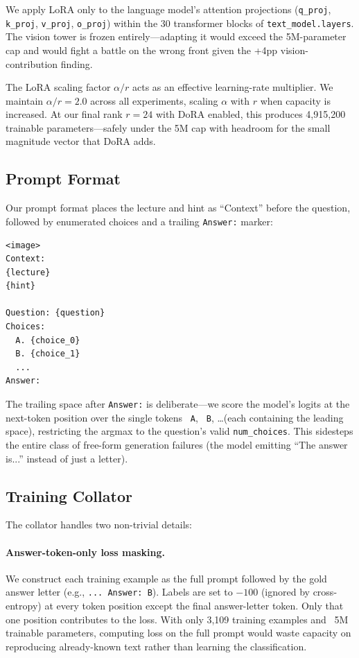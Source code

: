 \documentclass[11pt]{article}
\begin{document}
We apply LoRA only to the language model's attention projections (\texttt{q\_proj}, \texttt{k\_proj}, \texttt{v\_proj}, \texttt{o\_proj}) within the 30 transformer blocks of \texttt{text\_model.layers}. The vision tower is frozen entirely---adapting it would exceed the 5M-parameter cap and would fight a battle on the wrong front given the +4pp vision-contribution finding.

The LoRA scaling factor \(\alpha/r\) acts as an effective learning-rate multiplier. We maintain \(\alpha/r = 2.0\) across all experiments, scaling \(\alpha\) with \(r\) when capacity is increased. At our final rank \(r{=}24\) with DoRA enabled, this produces 4{,}915{,}200 trainable parameters---safely under the 5M cap with headroom for the small magnitude vector that DoRA adds.

\subsection{Prompt Format}

Our prompt format places the lecture and hint as ``Context'' before the question, followed by enumerated choices and a trailing \texttt{Answer:} marker:

\begin{verbatim}
<image>
Context:
{lecture}
{hint}

Question: {question}
Choices:
  A. {choice_0}
  B. {choice_1}
  ...
Answer:
\end{verbatim}

The trailing space after \texttt{Answer:} is deliberate---we score the model's logits at the next-token position over the single tokens \texttt{ A}, \texttt{ B}, \dots (each containing the leading space), restricting the argmax to the question's valid \texttt{num\_choices}. This sidesteps the entire class of free-form generation failures (the model emitting ``The answer is...'' instead of just a letter).

\subsection{Training Collator}

The collator handles two non-trivial details:

\paragraph{Answer-token-only loss masking.} We construct each training example as the full prompt followed by the gold answer letter (e.g., \texttt{... Answer: B}). Labels are set to \(-100\) (ignored by cross-entropy) at every token position except the final answer-letter token. Only that one position contributes to the loss. With only 3,109 training examples and ~5M trainable parameters, computing loss on the full prompt would waste capacity on reproducing already-known text rather than learning the classification.
\end{document}
